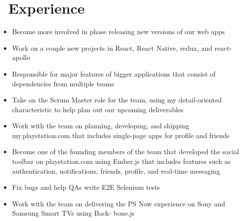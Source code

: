 \documentclass{resume}
\begin{document}



\section{\faUsers\ Experience}
\begin{itemize}
  \item Become more involved in phase releasing new versions of our web apps
  \item Work on a couple new projects in React, React Native, redux, and react-apollo
  \item Responsible for major features of bigger applications that consist of dependencies from multiple teams
\end{itemize}

\begin{itemize}
  \item Take on the Scrum Master role for the team, using my detail-oriented characteristic to help plan out our upcoming deliverables
  \item Work with the team on planning, developing, and shipping my.playstation.com that includes single-page apps for profile and friends
\end{itemize}

\begin{itemize}
  \item Become one of the founding members of the team that developed the social toolbar on playstation.com using Ember.js that includes features such as authentication, notifications, friends, profile, and real-time messaging
  \item Fix bugs and help QAs write E2E Selenium tests
\end{itemize}

\begin{itemize}
  \item Work with the team on delivering the PS Now experience on Sony and Samsung Smart TVs using Back- bone.js
\end{itemize}
\end{document}
